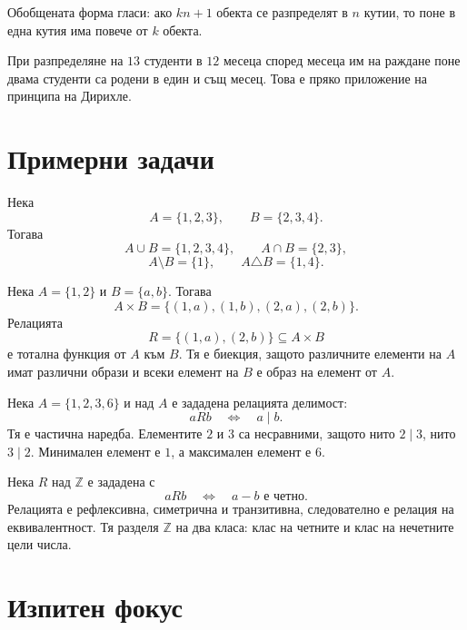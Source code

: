 Обобщената форма гласи: ако $kn+1$ обекта се разпределят в $n$ кутии, то поне в една кутия има повече от $k$ обекта.

\begin{example}
При разпределяне на $13$ студенти в $12$ месеца според месеца им на раждане поне двама студенти са родени в един и същ месец. Това е пряко приложение на принципа на Дирихле.
\end{example}

\section{Примерни задачи}\label{s:1.8}

\begin{example}
Нека
\[
A=\{1,2,3\},\qquad B=\{2,3,4\}.
\]
Тогава
\[
A\cup B=\{1,2,3,4\},\qquad
A\cap B=\{2,3\},
\]
\[
A\setminus B=\{1\},\qquad
A\triangle B=\{1,4\}.
\]
\end{example}

\begin{example}
Нека $A=\{1,2\}$ и $B=\{a,b\}$. Тогава
\[
A\times B=\{(1,a),(1,b),(2,a),(2,b)\}.
\]
Релацията
\[
R=\{(1,a),(2,b)\}\subseteq A\times B
\]
е тотална функция от $A$ към $B$. Тя е биекция, защото различните елементи на $A$ имат различни образи и всеки елемент на $B$ е образ на елемент от $A$.
\end{example}

\begin{example}
Нека $A=\{1,2,3,6\}$ и над $A$ е зададена релацията делимост:
\[
aRb\quad\Longleftrightarrow\quad a\mid b.
\]
Тя е частична наредба. Елементите $2$ и $3$ са несравними, защото нито $2\mid 3$, нито $3\mid 2$. Минимален елемент е $1$, а максимален елемент е $6$.
\end{example}

\begin{example}
Нека $R$ над $\mathbb Z$ е зададена с
\[
aRb\quad\Longleftrightarrow\quad a-b\text{ е четно}.
\]
Релацията е рефлексивна, симетрична и транзитивна, следователно е релация на еквивалентност. Тя разделя $\mathbb Z$ на два класа: клас на четните и клас на нечетните цели числа.
\end{example}

\section{Изпитен фокус}\label{s:1.9}

